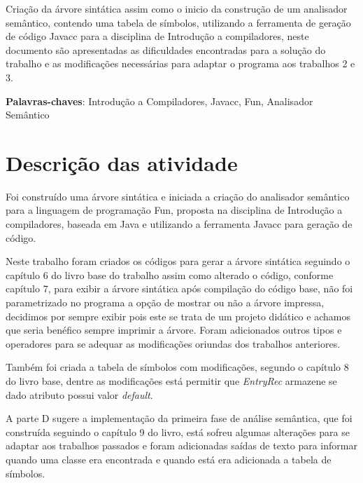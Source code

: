 \documentclass[
	article,			%
	11pt,				%
	oneside,			%
	a4paper,			%
	portuguese,			%
	brazil,				%
	sumario=tradicional
	]{abntex2}
\begin{document}
\frenchspacing 

\maketitle

\begin{resumoumacoluna}

Criação da árvore sintática assim como o inicio da construção de um analisador semântico, contendo uma tabela de símbolos, utilizando a ferramenta de geração de código Javacc para a disciplina de Introdução a compiladores, neste documento são apresentadas as dificuldades encontradas para a solução do trabalho e as modificações necessárias para adaptar o programa aos trabalhos 2 e 3.

 \vspace{\onelineskip}
 
 \noindent
 \textbf{Palavras-chaves}: Introdução a Compiladores, Javacc, Fun, Analisador Semântico
\end{resumoumacoluna}

\newpage
\tableofcontents*
\newpage
\textual
\section{Descrição das atividade}

Foi construído uma árvore sintática e iniciada a criação do analisador semântico para a linguagem de programação Fun, proposta na disciplina de Introdução a compiladores, baseada em Java e utilizando a ferramenta Javacc para geração de código.

Neste trabalho foram criados os códigos para gerar a árvore sintática seguindo o capítulo 6 do livro base do trabalho assim como alterado o código, conforme capítulo 7, para exibir a árvore sintática após compilação do código base, não foi parametrizado no programa a opção de mostrar ou não a árvore impressa, decidimos por sempre exibir pois este se trata de um projeto didático e achamos que seria benéfico sempre imprimir a árvore. Foram adicionados outros tipos e operadores para se adequar as modificações oriundas dos trabalhos anteriores.

Também foi criada a tabela de símbolos com modificações, segundo o capítulo 8 do livro base, dentre as modificações está permitir que \textit{EntryRec} armazene se dado atributo possui valor \textit{default}.

A parte D sugere a implementação da primeira fase de análise semântica, que foi construída seguindo o capítulo 9 do livro, está sofreu algumas alterações para se adaptar aos trabalhos passados e foram adicionadas saídas de texto para informar quando uma classe era encontrada e quando está era adicionada a tabela de símbolos.
 
\end{document}
